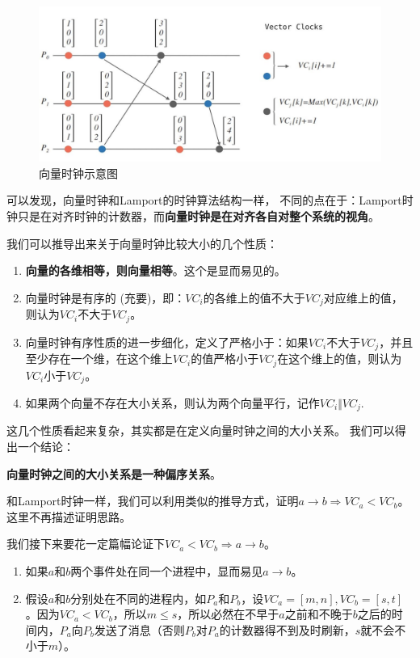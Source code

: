 \documentclass[cn,11pt,chinese]{elegantbook}
\providecommand{\tightlist}{%
  \setlength{\itemsep}{0pt}\setlength{\parskip}{0pt}}
\begin{document}
\begin{figure}
\centering
\includegraphics{images/appendix-a-13.jpeg}
\caption{向量时钟示意图}
\end{figure}

可以发现，向量时钟和Lamport的时钟算法结构一样，
不同的点在于：Lamport时钟只是在对齐时钟的计数器，而\textbf{向量时钟是在对齐各自对整个系统的视角}。

我们可以推导出来关于向量时钟比较大小的几个性质：

\begin{enumerate}
\def\labelenumi{\arabic{enumi}.}
\tightlist
\item
  \textbf{向量的各维相等，则向量相等}。这个是显而易见的。
\item
  向量时钟是有序的
  (充要)，即：\(VC_i\)的各维上的值不大于\(VC_j\)对应维上的值，则认为\(VC_i\)不大于\(VC_j\)。
\item
  向量时钟有序性质的进一步细化，定义了严格小于：如果\(VC_i\)不大于\(VC_j\)，并且至少存在一个维，在这个维上\(VC_i\)的值严格小于\(VC_j\)在这个维上的值，则认为\(VC_i\)小于\(VC_j\)。
\item
  如果两个向量不存在大小关系，则认为两个向量平行，记作\(VC_i \Vert VC_j\).
\end{enumerate}

这几个性质看起来复杂，其实都是在定义向量时钟之间的大小关系。
我们可以得出一个结论：

\textbf{向量时钟之间的大小关系是一种偏序关系}。

和Lamport时钟一样，我们可以利用类似的推导方式，证明\(a \rightarrow b \Rightarrow VC_a < VC_b\)。这里不再描述证明思路。

我们接下来要花一定篇幅论证下\(VC_a < VC_b \Rightarrow a \rightarrow b\)。

\begin{enumerate}
\def\labelenumi{\arabic{enumi}.}
\tightlist
\item
  如果\(a\)和\(b\)两个事件处在同一个进程中，显而易见\(a \rightarrow b\)。
\item
  假设\(a\)和\(b\)分别处在不同的进程内，如\(P_a\)和\(P_b\)，设\(VC_a = [m,n], VC_b = [s,t]\)。因为\(VC_a < VC_b\)，所以\(m≤s\)，所以必然在不早于\(a\)之前和不晚于\(b\)之后的时间内，\(P_a\)向\(P_b\)发送了消息（否则\(P_b\)对\(P_a\)的计数器得不到及时刷新，\(s\)就不会不小于\(m\)）。
\end{enumerate}
\end{document}
